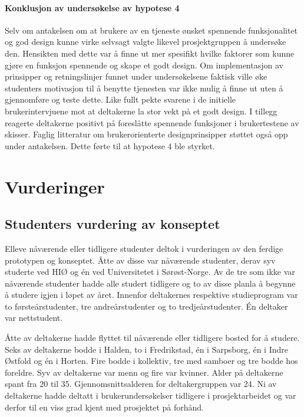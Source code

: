 \paragraph{Konklusjon av undersøkelse av hypotese 4}
Selv om antakelsen om at brukere av en tjeneste ønsket spennende funksjonalitet og god design kunne virke selvsagt valgte likevel prosjektgruppen å undersøke den. Hensikten med dette var å finne ut mer spesifikt hvilke faktorer som kunne gjøre en funksjon spennende og skape et godt design. Om implementasjon av prinsipper og retningslinjer funnet under undersøkelsene faktisk ville øke studenters motivasjon til å benytte tjenesten var ikke mulig å finne ut uten å gjennomføre og teste dette. Like fullt pekte svarene i de initielle brukerintervjuene mot at deltakerne la stor vekt på et godt design. I tillegg reagerte deltakerne positivt på foreslåtte spennende funksjoner i brukertestene av skisser. Faglig litteratur om brukerorienterte designprinsipper støttet også opp under antakelsen. Dette førte til at hypotese 4 ble styrket.


\section{Vurderinger}

\subsection{Studenters vurdering av konseptet}
Elleve nåværende eller tidligere studenter deltok i vurderingen av den ferdige prototypen og konseptet. Åtte av disse var nåværende studenter, derav syv studerte ved HIØ og én ved Universitetet i Sørøst-Norge. Av de tre som ikke var nåværende studenter hadde alle studert tidligere og to av disse planla å begynne å studere igjen i løpet av året. Innenfor deltakernes respektive studieprogram var to førsteårstudenter, tre andreårstudenter og to tredjeårstudenter. Én deltaker var nettstudent.

Åtte av deltakerne hadde flyttet til nåværende eller tidligere bosted for å studere. Seks av deltakerne bodde i Halden, to i Fredrikstad, én i Sarpsborg, én i Indre Østfold og én i Horten. Fire bodde i kollektiv, tre med samboer og tre bodde hos foreldre. Syv av deltakerne var menn og fire var kvinner. Alder på deltakerne spant fra 20 til 35. Gjennomsnittsalderen for deltakergruppen var 24. Ni av deltakerne hadde deltatt i brukerundersøkelser tidligere i prosjektarbeidet og var derfor til en viss grad kjent med prosjektet på forhånd.

